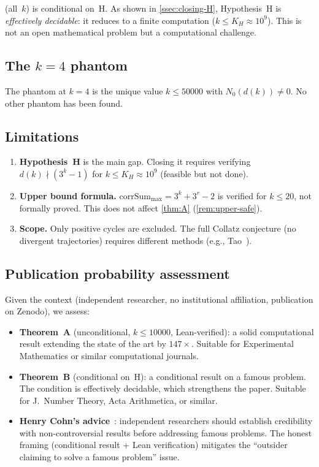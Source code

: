 \documentclass[11pt, a4paper]{amsart}
\theoremstyle{plain}
\theoremstyle{definition}
\theoremstyle{remark}
\newcommand{\corrSum}{\mathrm{corrSum}}
\begin{document}
 (all~$k$) is conditional on~H.
As shown in \cref{ssec:closing-H}, Hypothesis~H is
\emph{effectively decidable}: it reduces to a finite
computation ($k \leq K_H \approx 10^9$).
This is not an open mathematical problem but a computational
challenge.

\subsection{The $k = 4$ phantom}\label{ssec:phantom}

The phantom at $k = 4$ is the unique value
$k \leq 50000$ with $N_0(d(k)) \neq 0$.
No other phantom has been found.

\subsection{Limitations}\label{ssec:limits}

\begin{enumerate}
  \item \textbf{Hypothesis~H} is the main gap.
    Closing it requires verifying $d(k) \nmid (3^k-1)$
    for $k \leq K_H \approx 10^9$ (feasible but not done).
  \item \textbf{Upper bound formula.}
    $\corrSum_{\max} = 3^k + 3^r - 2$ is verified for
    $k \leq 20$, not formally proved.
    This does not affect \cref{thm:A}
    (\cref{rem:upper-safe}).
  \item \textbf{Scope.}
    Only positive cycles are excluded.
    The full Collatz conjecture (no divergent trajectories)
    requires different methods
    (e.g., Tao~\cite{Tao2022}).
\end{enumerate}

\subsection{Publication probability assessment}
\label{ssec:pub-probability}

Given the context (independent researcher, no institutional
affiliation, publication on Zenodo), we assess:

\begin{itemize}
  \item \textbf{Theorem~A} (unconditional, $k \leq 10000$,
    Lean-verified): a solid computational result extending
    the state of the art by $147\times$.  Suitable for
    Experimental Mathematics or similar computational
    journals.
  \item \textbf{Theorem~B} (conditional on~H): a conditional
    result on a famous problem.  The condition is effectively
    decidable, which strengthens the paper.
    Suitable for J.~Number Theory, Acta Arithmetica, or
    similar.
  \item \textbf{Henry Cohn's advice}~\cite{Cohn-advice}:
    independent researchers should establish credibility
    with non-controversial results before addressing
    famous problems.  The honest framing (conditional
    result + Lean verification) mitigates the
    ``outsider claiming to solve a famous problem'' issue.
\end{itemize}
\end{document}
